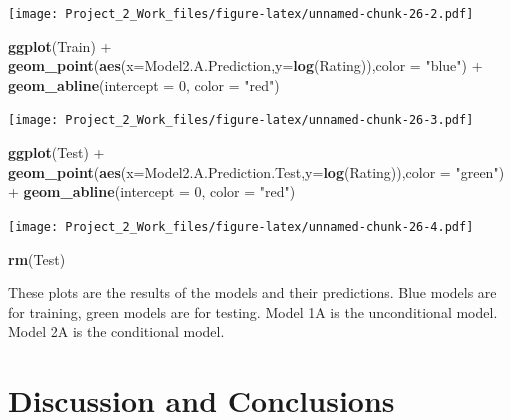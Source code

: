 \documentclass[]{article}
\newenvironment{Shaded}{\begin{snugshade}}{\end{snugshade}}
\newcommand{\KeywordTok}[1]{\textcolor[rgb]{0.13,0.29,0.53}{\textbf{{#1}}}}
\newcommand{\DataTypeTok}[1]{\textcolor[rgb]{0.13,0.29,0.53}{{#1}}}
\newcommand{\DecValTok}[1]{\textcolor[rgb]{0.00,0.00,0.81}{{#1}}}
\newcommand{\StringTok}[1]{\textcolor[rgb]{0.31,0.60,0.02}{{#1}}}
\newcommand{\NormalTok}[1]{{#1}}
\begin{document}
\texttt{[image: Project\_2\_Work\_files/figure-latex/unnamed-chunk-26-2.pdf]}

\begin{Shaded}
\begin{Highlighting}[]
\KeywordTok{ggplot}\NormalTok{(Train) +}\StringTok{ }\KeywordTok{geom_point}\NormalTok{(}\KeywordTok{aes}\NormalTok{(}\DataTypeTok{x=}\NormalTok{Model2.A.Prediction,}\DataTypeTok{y=}\KeywordTok{log}\NormalTok{(Rating)),}\DataTypeTok{color =} \StringTok{"blue"}\NormalTok{) +}
\StringTok{  }\KeywordTok{geom_abline}\NormalTok{(}\DataTypeTok{intercept =} \DecValTok{0}\NormalTok{, }\DataTypeTok{color =} \StringTok{"red"}\NormalTok{)}
\end{Highlighting}
\end{Shaded}

\texttt{[image: Project\_2\_Work\_files/figure-latex/unnamed-chunk-26-3.pdf]}

\begin{Shaded}
\begin{Highlighting}[]
\KeywordTok{ggplot}\NormalTok{(Test) +}\StringTok{ }\KeywordTok{geom_point}\NormalTok{(}\KeywordTok{aes}\NormalTok{(}\DataTypeTok{x=}\NormalTok{Model2.A.Prediction.Test,}\DataTypeTok{y=}\KeywordTok{log}\NormalTok{(Rating)),}\DataTypeTok{color =} \StringTok{"green"}\NormalTok{) +}
\StringTok{  }\KeywordTok{geom_abline}\NormalTok{(}\DataTypeTok{intercept =} \DecValTok{0}\NormalTok{, }\DataTypeTok{color =} \StringTok{"red"}\NormalTok{)}
\end{Highlighting}
\end{Shaded}

\texttt{[image: Project\_2\_Work\_files/figure-latex/unnamed-chunk-26-4.pdf]}

\begin{Shaded}
\begin{Highlighting}[]
\KeywordTok{rm}\NormalTok{(Test)}
\end{Highlighting}
\end{Shaded}

These plots are the results of the models and their predictions. Blue
models are for training, green models are for testing. Model 1A is the
unconditional model. Model 2A is the conditional model.

\section{Discussion and Conclusions}\label{discussion-and-conclusions}
\end{document}
